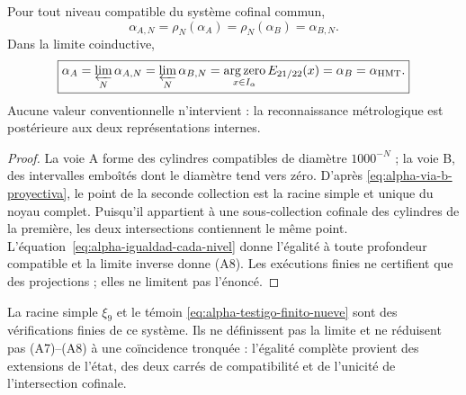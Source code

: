 \begin{theorem}
\label{prop:alpha-dos-limites-historico-rev04}
Pour tout niveau compatible du système cofinal commun,
\begingroup
\renewcommand{\theequation}{A7}
\begin{equation}
 \boxed{\alpha_{A,N}=\rho_N(\alpha_A)
 =\rho_N(\alpha_B)=\alpha_{B,N}.}
 \label{eq:alpha-dos-vias-cada-nivel-historico-rev04}
\end{equation}
\endgroup
Dans la limite coinductive,
\begingroup
\renewcommand{\theequation}{A8}
\begin{equation}
 \boxed{\alpha_A
 =\varprojlim_N\alpha_{A,N}
 =\varprojlim_N\alpha_{B,N}
 =\operatorname*{arg\,zero}_{x\in I_\alpha}E_{21/22}(x)
 =\alpha_B=\alpha_{\mathrm{HMT}}.}
 \label{eq:alpha-dos-vias-limite-coinductivo-historico-rev04}
\end{equation}
\endgroup
Aucune valeur conventionnelle n'intervient : la reconnaissance métrologique est postérieure aux deux représentations internes.
\end{theorem}

\begin{proof}
La voie A forme des cylindres compatibles de diamètre \(1000^{-N}\) ; la voie B, des intervalles emboîtés dont le diamètre tend vers zéro. D'après \eqref{eq:alpha-via-b-proyectiva}, le point de la seconde collection est la racine simple et unique du noyau complet. Puisqu'il appartient à une sous-collection cofinale des cylindres de la première, les deux intersections contiennent le même point. L'équation~\eqref{eq:alpha-igualdad-cada-nivel} donne l'égalité à toute profondeur compatible et la limite inverse donne (A8). Les exécutions finies ne certifient que des projections ; elles ne limitent pas l'énoncé.
\end{proof}

La racine simple \(\xi_9\) et le témoin \eqref{eq:alpha-testigo-finito-nueve} sont des vérifications finies de ce système. Ils ne définissent pas la limite et ne réduisent pas (A7)--(A8) à une coïncidence tronquée : l'égalité complète provient des extensions de l'état, des deux carrés de compatibilité et de l'unicité de l'intersection cofinale.
